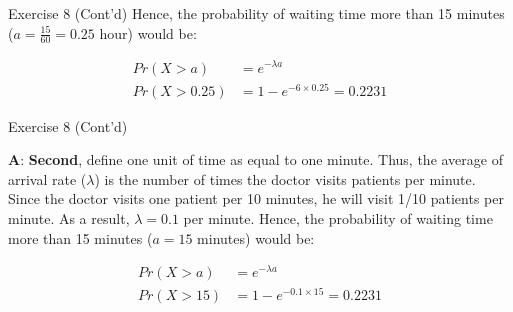 \documentclass[
  ignorenonframetext,
  aspectratio=43,
]{beamer}
\begin{document}
\begin{frame}{Exercise 8 (Cont'd)}
\protect\hypertarget{exercise-8-contd}{}
Hence, the probability of waiting time more than 15 minutes
(\(a = \frac{15}{60} = 0.25\) hour) would be:

\[
\begin{aligned}
Pr(X > a) &= e^{-\lambda a} \\
Pr(X > 0.25) &= 1 - e^{-6 \times 0.25} = 0.2231
\end{aligned}
\]
\end{frame}

\begin{frame}{Exercise 8 (Cont'd)}
\protect\hypertarget{exercise-8-contd-1}{}
\pause

\textbf{A}: \textbf{Second}, define one unit of time as equal to one
minute. Thus, the average of arrival rate (\(\lambda\)) is the number of
times the doctor visits patients per minute. Since the doctor visits one
patient per 10 minutes, he will visit 1/10 patients per minute. As a
result, \(\lambda=0.1\) per minute. Hence, the probability of waiting
time more than 15 minutes (\(a=15\) minutes) would be:

\[
\begin{aligned}
Pr(X > a) &= e^{-\lambda a} \\
Pr(X > 15) &= 1 - e^{-0.1 \times 15} = 0.2231
\end{aligned}
\]
\end{frame}
\end{document}
